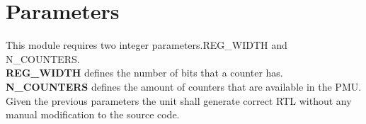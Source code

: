 \section{Parameters}
\label{chapter3}
This module requires two integer parameters.REG\_WIDTH and N\_COUNTERS. \\
\textbf{REG\_WIDTH} defines the number of bits that a counter has.\\
\textbf{N\_COUNTERS} defines the amount of counters that are available in the PMU.\\
Given the previous parameters the unit shall generate correct RTL without any manual modification to the source code.

